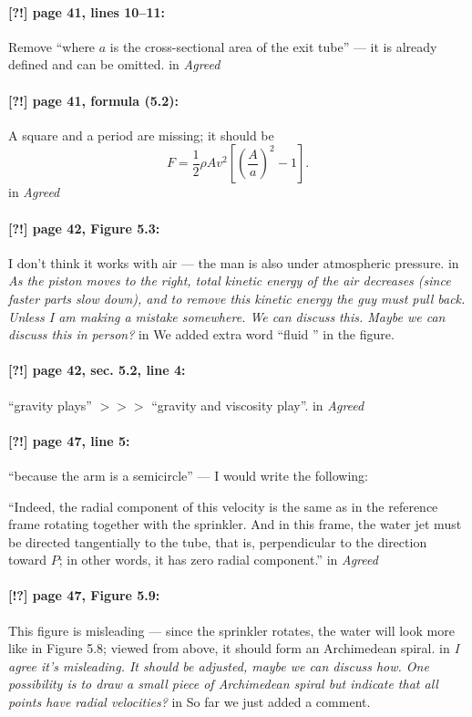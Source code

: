 \documentclass[twoside]{article}
\begin{document}
\paragraph{[?!] page 41, lines 10--11:} Remove “where $a$ is the cross-sectional area of the exit tube” — it is already defined and can be omitted.
 in {\it  Agreed} 

\paragraph{[?!] page 41, formula (5.2):}
A square and a period are missing; it should be
\[
F = \frac{1}{2} \rho A v^{2} \left[ \left( \frac{A}{a} \right)^{2} - 1 \right].
\]
 in {\it  Agreed} 

\paragraph{[?!] page 42, Figure 5.3:}
I don’t think it works with air — the man is also under atmospheric pressure.
 in
{\it As the piston moves to the right, total kinetic energy of the air decreases (since faster parts slow down), and to remove this kinetic energy the guy must pull back. Unless I am making a mistake somewhere. We can discuss this.  Maybe we can discuss this in person?}
 in
We added extra word ``fluid '' in the figure.

\paragraph{[?!] page 42, sec. 5.2, line 4:} “gravity plays” $>\!>\!>$ “gravity and viscosity play”.
 in {\it  Agreed} 

\paragraph{[?!] page 47, line 5:} “because the arm is a semicircle” — I would write the following:

“Indeed, the radial component of this velocity is the same as in the reference frame rotating together with the sprinkler.
And in this frame, the water jet must be directed tangentially to the tube, that is, perpendicular to the direction toward $P$; in other words, it has zero radial component.”
 in {\it  Agreed} 

\paragraph{[!?] page 47, Figure 5.9:} This figure is misleading — since the sprinkler rotates, the water will look more like in Figure 5.8; viewed from above, it should form an Archimedean spiral.
 in
{\it  I agree it's misleading. It should be adjusted, maybe we can discuss how. One possibility is to draw a small piece of Archimedean spiral but indicate that all points have radial velocities?}
 in
So far we just added a comment.
\end{document}
